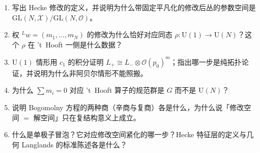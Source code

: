 \begin{checkbox}
\begin{enumerate}
\item 写出 Hecke 修改的定义，并说明为什么带固定平凡化的修改后丛的参数空间是 $\mathrm{GL}(N,\mathcal X)/\mathrm{GL}(N,\mathcal O)$。
\item 权 ${}^{L}w=(m_1,\dots,m_N)$ 的修改为什么恰好对应同态 $\rho:\mathrm{U}(1)\to\mathrm{U}(N)$？这个 $\rho$ 在 't~Hooft 一侧是什么数据？
\item $\mathrm{U}(1)$ 情形用 $c_1$ 的积分证明 $L_+\cong L_-\otimes\mathcal O(p_0)^m$；指出哪一步是纯拓扑论证，并说明为什么非阿贝尔情形不能照搬。
\item 为什么 $\sum m_i=0$ 对应 't~Hooft 算子的规范群是 $G$ 而不是 $\mathrm{U}(N)$？
\item 说明 Bogomolny 方程的两种商（辛商与复商）各是什么，为什么说「修改空间 $=$ 解空间」只在复结构意义上成立。
\item 什么是单极子冒泡？它对应修改空间紧化的哪一步？Hecke 特征层的定义与几何 Langlands 的标准陈述各是什么？
\end{enumerate}
\end{checkbox}

